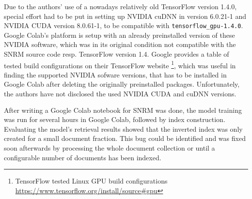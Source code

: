 Due to the authors' use of a nowadays relatively old TensorFlow version 1.4.0, special effort had to be put in setting up
    NVIDIA cuDNN in version 6.0.21-1 and NVIDIA CUDA version 8.0.61-1, to be compatible with \verb|tensorflow_gpu-1.4.0|.
Google Colab's platform is setup with an already preinstalled version of these NVIDIA software, which was in its original condition
    not compatible with the SNRM source code resp. TensorFlow version 1.4.
Google provides a table of tested build configurations on their TensorFlow website
    \footnote{TensorFlow tested Linux GPU build configurations \url{https://www.tensorflow.org/install/source\#gpu}}, 
    which was useful in finding the supported NVIDIA sofware versions, that has to be installed in Google Colab 
    after deleting the originally preinstalled packages.
Unfortunately, the authors have not disclosed the used NVIDIA CUDA and cuDNN versions.

After writing a Google Colab notebook for SNRM was done, the model training was run for several hours in Google Colab,
    followed by index construction.
Evaluating the model's retrieval results showed that the inverted index was only created for a small document fraction.
This bug could be identified and was fixed soon afterwards by processing the whole document collection or until a
    configurable number of documents has been indexed.

